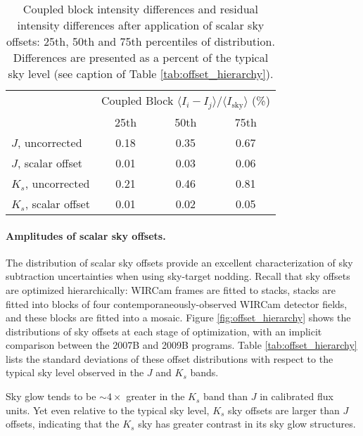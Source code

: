 \documentclass[iop]{emulateapj}
\begin{document}
\begin{table}[t]
	\centering
	\caption[Coupled block differences and residual differences after
	scalar sky offsets]{Coupled block intensity differences and residual intensity differences after application of scalar sky offsets: 25th, 50th and 75th percentiles of distribution. Differences are presented as a percent of the typical sky level (see caption of Table \ref{tab:offset_hierarchy}).}
	\label{tab:resid_diffs}
	\begin{tabular}{lccc}
		& \multicolumn{3}{c}{Coupled Block $\langle I_i - I_j\rangle / \langle I_\mathrm{sky} \rangle$ (\%)} \\
		& 25th & 50th & 75th \\
		\hline
		$J$, uncorrected & 0.18 & 0.35 & 0.67 \\
		$J$, scalar offset & 0.01 & 0.03 & 0.06 \\
		\hline
		$K_s$, uncorrected & 0.21 & 0.46 & 0.81 \\
		$K_s$, scalar offset & 0.01 & 0.02 & 0.05 \\
		\hline
	\end{tabular}
\end{table}



\paragraph{Amplitudes of scalar sky offsets.} The distribution of scalar sky offsets provide an excellent characterization of sky subtraction uncertainties when using sky-target nodding. Recall that sky offsets are optimized hierarchically: WIRCam frames are fitted to stacks, stacks are fitted into blocks of four contemporaneously-observed WIRCam detector fields, and these blocks are fitted into a mosaic. Figure \ref{fig:offset_hierarchy} shows the distributions of sky offsets at each stage of optimization, with an implicit comparison between the 2007B and 2009B programs. Table \ref{tab:offset_hierarchy} lists the standard deviations of these offset distributions with respect to the typical sky level observed in the $J$ and $K_s$ bands.

Sky glow tends to be $\sim 4\times$ greater in the $K_s$ band than $J$ in calibrated flux units.
Yet even relative to the typical sky level, $K_s$ sky offsets are larger than $J$ offsets, indicating that the $K_s$ sky has greater contrast in its sky glow structures.
\end{document}
